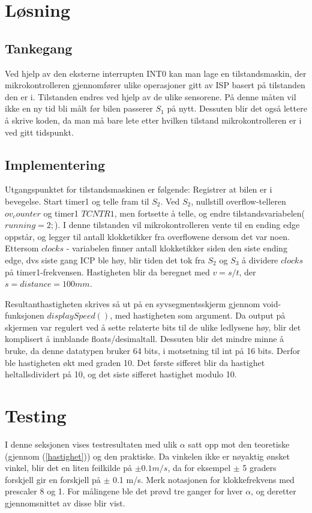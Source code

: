 \documentclass[11pt, a4paper]{article}
\begin{document}
\section{Løsning}
\subsection{Tankegang}
Ved hjelp av den eksterne interrupten INT0 kan man lage en tilstandsmaskin, der mikrokontrolleren gjennomfører ulike operasjoner gitt av ISP basert på tilstanden den er i. Tilstanden endres ved hjelp av de ulike sensorene. På denne måten vil ikke en ny tid bli målt før bilen passerer $S_{1}$ på nytt. Dessuten blir det også lettere å skrive koden, da man må bare lete etter hvilken tilstand mikrokontrolleren er i ved gitt tidspunkt. 

\subsection{Implementering}
Utgangspunktet for tilstandsmaskinen er følgende: Registrer at bilen er i bevegelse. Start timer1 og telle fram til $S_{2}$. Ved $S_{2}$, nullstill overflow-telleren $ov_counter$ og timer1 $TCNTR1$, men fortsette å telle, og endre tilstandsvariabelen($running = 2;$). I denne tilstanden vil mikrokontrolleren vente til en ending edge oppstår, og legger til antall klokketikker fra overflowene dersom det var noen. Ettersom $clocks$ - variabelen finner antall klokketikker siden den siste ending edge, dvs siste gang ICP ble høy, blir tiden det tok fra $S_{2}$ og $S_{3}$ å dividere $clocks$ på timer1-frekvensen. Hastigheten blir da beregnet med $v = s/t$, der $ s = distance = 100mm$.\newline

Resultanthastigheten skrives så ut på en syvsegmentsskjerm gjennom void-funksjonen $displaySpeed()$, med hastigheten som argument. Da output på skjermen var regulert ved å sette relaterte bits til de ulike ledlysene høy, blir det komplisert å innblande floats/desimaltall. Dessuten blir det mindre minne å bruke, da denne datatypen bruker 64 bits, i motsetning til int på 16 bits. Derfor ble hastigheten økt med graden 10. Det første sifferet blir da hastighet heltallsdividert på 10, og det siste sifferet hastighet modulo 10. 


\section{Testing}
I denne seksjonen vises testresultaten med ulik $\alpha$ satt opp mot den teoretiske (gjennom (\ref{hastighet})) og den praktiske. Da vinkelen ikke er nøyaktig ønsket vinkel, blir det en liten feilkilde på $\pm 0.1m/s$, da for eksempel $\pm$ 5 graders forskjell gir en forskjell på $\pm$ 0.1 m/s. Merk notasjonen for klokkefrekvens med prescaler 8 og 1. For målingene ble det prøvd tre ganger for hver $\alpha$, og deretter gjennomsnittet av disse blir vist. 
\end{document}

